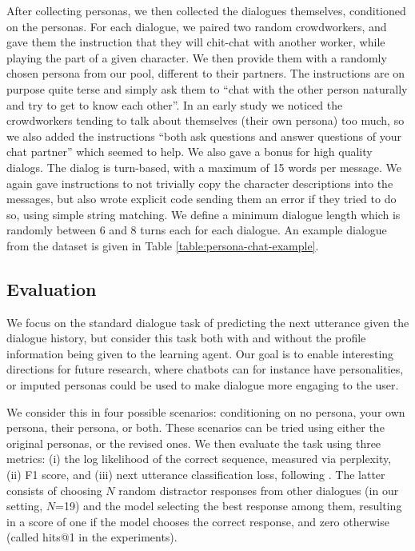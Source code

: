 After collecting personas, we then collected the dialogues themselves, conditioned on the personas.
For each dialogue, we paired two random crowdworkers, and gave them the instruction that they will chit-chat with another worker, while
playing the part of a given character. We then provide them with a randomly chosen persona from our pool, different to their partners.
The instructions are on purpose quite terse and simply ask them to 
``chat with the other person naturally and try to get to know each other''.
In an early study we noticed the crowdworkers tending to talk about themselves (their own persona) too much, so
we also added the instructions
``both ask questions and answer questions of your chat partner'' which seemed to help.
We also gave a bonus for high quality dialogs.
The dialog is turn-based, with a maximum of 15 words per message.
We again gave instructions to not  trivially copy the character descriptions into the messages,
but also wrote explicit code sending them an error if they tried to do so, using simple string matching.
We define a minimum dialogue length which is randomly between 6 and 8 turns each for each dialogue.
An example dialogue from the dataset is given in Table  \ref{table:persona-chat-example}.


\subsection{Evaluation}

We focus on the standard dialogue task of predicting the next utterance given the dialogue history, but consider this task both with and without the profile information being given to the learning agent. Our goal is to enable interesting directions for future research, where chatbots can for instance have personalities, or imputed personas could be used to make dialogue more engaging to the user.

We consider this in four possible scenarios: conditioning on no persona, your own persona, their persona, or both. These scenarios can be tried using either the original personas, or the revised ones.
We then evaluate the task using three metrics: (i) the log likelihood of the correct sequence, measured via perplexity, (ii) F1 score, and (iii) 
next utterance classification loss, following .
The latter consists of choosing $N$ random distractor responses from other dialogues (in our setting, $N$=19) and the model selecting the best response among them, resulting in a score of one if the model chooses the correct response, and zero otherwise (called hits@1 in the experiments). %


